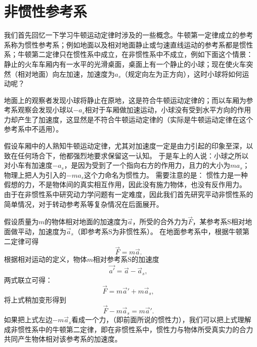 

\chapter{非惯性参考系}
我们首先回忆一下学习牛顿运动定律时涉及的一些概念。牛顿第一定律成立的参考系称为惯性参考系；例如地面以及相对地面静止或匀速直线运动的参考系都是惯性系；牛顿第二定律只在惯性系中成立，在非惯性系中不成立，例如下面这个情景：
静止的火车车厢内有一水平的光滑桌面，桌面上有一个静止的小球；现在使火车突然（相对地面）向左加速，加速度为$ a_s $（规定向左为正方向），这时小球将如何运动呢？


地面上的观察者发现小球将静止在原地，这是符合牛顿运动定律的；而以车厢为参考系观察会发现小球以$-a_s$相对于车厢做加速运动，小球没有受到水平方向的作用力却产生了加速度，这显然是不符合牛顿运动定律的（实际是牛顿运动定律在这个参考系中不适用）。


假设车厢中的人熟知牛顿运动定律，尤其对加速度一定是由力引起的印象至深，以致在任何场合下，他都强烈地要求保留这一认知。
于是车上的人说：小球之所以对小车有加速度$ -a_s $，是因为受到了一个指向右方的作用力，且力的大小为$ ma_s $；物理上把人为引入的$ -ma_s $这个力命名为惯性力。
需要注意的是： 惯性力是一种假想的力，不是物体间的真实相互作用，因此没有施力物体，也没有反作用力。
由于在非惯性系中研究动力学问题有一定难度，因此我们首先研究平动非惯性系的简单情况，对于转动参考系等复杂情况在后面展开。




假设质量为$ m $的物体相对地面的加速度为$ \vec{a} $，所受的合外力为$ \vec{F} $，某参考系S相对地面做平动，加速度为$\vec{a}_s $（即参考系S为非惯性系）。
在地面参考系中，根据牛顿第二定律可得
\[
\vec{F} = m\vec{a}.
\]
根据相对运动的定义，物体$ m $相对参考系S的加速度
\begin{equation}
\vec{a'} = \vec{a}-\vec{a}_s,
\end{equation}
两式联立可得：
\begin{equation}
\vec{F} = m\vec{a}'+m\vec{a}_s,
\end{equation}
将上式稍加变形得到
\begin{equation}
\vec{F}-m\vec{a}_s = m\vec{a}'.
\end{equation}
如果把上式左边$-m \vec{a}_s$看成一个力，（即前面所说的惯性力），我们可以把上式理解成非惯性系中的牛顿第二定律，即在非惯性系中，惯性力与物体所受真实力的合力共同产生物体相对该参考系的加速度。

